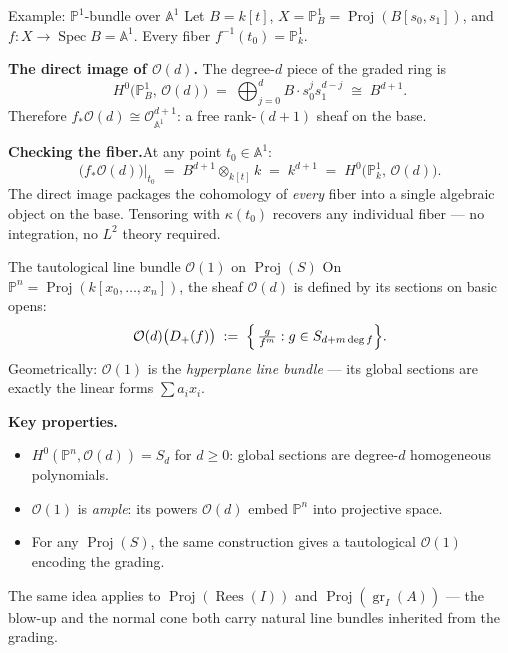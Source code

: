 \documentclass[aspectratio=169,12pt]{beamer}
\begin{document}
\begin{frame}{Example: $\mathbb{P}^1$-bundle over $\mathbb{A}^1$}
  Let $B = k[t]$, $X = \mathbb{P}^1_B = \operatorname{Proj}(B[s_0, s_1])$,
  and $f : X \to \operatorname{Spec} B = \mathbb{A}^1$.
  Every fiber $f^{-1}(t_0) = \mathbb{P}^1_k$.

  \medskip

  \textbf{The direct image of $\mathcal{O}(d)$.}\enspace
  The degree-$d$ piece of the graded ring is
  \[
    H^0\!\bigl(\mathbb{P}^1_B,\,\mathcal{O}(d)\bigr)
    \;=\; \bigoplus_{j=0}^{d} B\cdot s_0^j s_1^{d-j}
    \;\cong\; B^{d+1}.
  \]
  Therefore $f_*\mathcal{O}(d) \cong \mathcal{O}_{\mathbb{A}^1}^{d+1}$:
  a free rank-$(d+1)$ sheaf on the base.

  \medskip

  \textbf{Checking the fiber.}\enspace At any point $t_0 \in \mathbb{A}^1$:
  \[
    \bigl(f_*\mathcal{O}(d)\bigr)\big|_{t_0}
    \;=\; B^{d+1} \otimes_{k[t]} k
    \;=\; k^{d+1}
    \;=\; H^0\!\bigl(\mathbb{P}^1_k,\,\mathcal{O}(d)\bigr).
  \]
  The direct image packages the cohomology of \emph{every} fiber into a
  single algebraic object on the base.
  Tensoring with $\kappa(t_0)$ recovers any individual fiber — no
  integration, no $L^2$ theory required.
\end{frame}

\begin{frame}{The tautological line bundle $\mathcal{O}(1)$ on $\operatorname{Proj}(S)$}
  On $\mathbb{P}^n = \operatorname{Proj}(k[x_0,\ldots,x_n])$, the sheaf
  $\mathcal{O}(d)$ is defined by its sections on basic opens:
  \[
    \mathcal{O}(d)\bigl(D_+(f)\bigr)
    \;:=\; \Bigl\{\,\tfrac{g}{f^m} : g \in S_{d + m\deg f}\Bigr\}.
  \]
  Geometrically: $\mathcal{O}(1)$ is the \emph{hyperplane line bundle} —
  its global sections are exactly the linear forms $\sum a_i x_i$.

  \medskip

  \textbf{Key properties.}
  \begin{itemize}
    \item $H^0(\mathbb{P}^n, \mathcal{O}(d)) = S_d$ for $d \geq 0$:
          global sections are degree-$d$ homogeneous polynomials.
    \item $\mathcal{O}(1)$ is \emph{ample}: its powers
          $\mathcal{O}(d)$ embed $\mathbb{P}^n$ into projective space.
    \item For any $\operatorname{Proj}(S)$, the same construction gives a
          tautological $\mathcal{O}(1)$ encoding the grading.
  \end{itemize}

  \medskip

  The same idea applies to $\operatorname{Proj}(\operatorname{Rees}(I))$
  and $\operatorname{Proj}(\operatorname{gr}_I(A))$ — the blow-up and the
  normal cone both carry natural line bundles inherited from the grading.
\end{frame}
\end{document}
